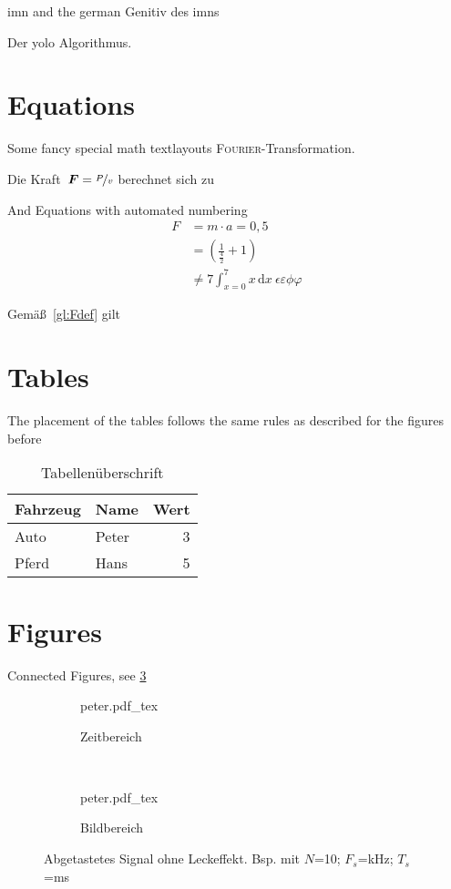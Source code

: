 \documentclass[12pt,
titlepage,
a4paper,
oneside,     %
openany,     %
listof=totoc,  %
numbers = noenddot, %
bibliography=totoc,    %
headsepline, %
]{scrbook} %
\newcommand{\ve}[1]{\ensuremath \boldsymbol{#1}\xspace}
\newcommand{\scFt}{\textsc{Fourier}-Transformation\xspace}
\begin{document}
\ac{imn} and the german Genitiv des \acp{imn}

Der \ac{yolo} Algorithmus.

\section{Equations}
\label{sec_Equations}
Some fancy special math textlayouts \scFt.

Die Kraft~$\ve{F} = \nicefrac{P}{v}$ berechnet sich zu

And Equations with automated numbering
\begin{align}
	F &= m \cdot a = 0,5 \nonumber\\
	&= \left( \frac{1}{\frac{4}{2}} + 1 \right)	\label{gl:Fdef}\\
	&\neq 7 \int_{x=0}^{7} x \, \mathrm{d}x ~ \epsilon \varepsilon \phi \varphi
\end{align}

Gemäß~\ref{gl:Fdef} gilt

\section{Tables}
\label{sec:tables}
The placement of the tables follows the same rules as described for the figures before

\begin{table}
	\caption{Tabellenüberschrift}
	\label{tab_ExampleTable}
	\centering
	\begin{tabular}{l l r}
		Fahrzeug & Name & Wert \\
		\toprule
		Auto & Peter & 3  \\ 
		Pferd & Hans & 5  \\
	\end{tabular}
\end{table}

\section{Figures}
\label{sec_figures}

Connected Figures, see \ref{fig:leck_toll}
\begin{figure}
	\centering
	\begin{subfigure}[b]{0.48\textwidth}
		\def\svgwidth{\columnwidth}
		{peter.pdf_tex}
		\caption{Zeitbereich}
		\label{leck_toll_t}
	\end{subfigure}
	~
	\begin{subfigure}[b]{0.48\textwidth}
		\def\svgwidth{\columnwidth}
		{peter.pdf_tex}
		\caption{Bildbereich}
		\label{leck_toll_f}
	\end{subfigure}
	\caption{Abgetastetes Signal ohne Leckeffekt. Bsp. mit $N$=10; $F_s$=\unit[1]{kHz}; $T_s$=\unit[10]{ms}}
	\label{fig:leck_toll}
\end{figure}
\end{document}
